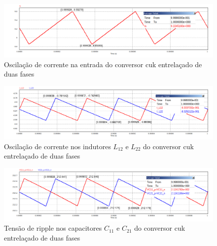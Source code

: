 \documentclass[
	12pt,				%
	openright,			%
	twoside,			%
	a4paper,			%
	english,			%
	french,				%
	spanish,			%
	brazil,				%
	]{abntex2}
\begin{document}
\begin{figure}[htb]%
	\captionsetup{justification=centering}
	\centering
		\includegraphics[width= \linewidth]{cuk_inter_ripp_I_S}
		\caption{Oscilação de corrente na entrada do conversor cuk entrelaçado de duas fases}
		\label{fig:cuk_inter_ripp_I_S}
\end{figure}

\begin{figure}[htb]%
	\captionsetup{justification=centering}
	\centering
		\includegraphics[width= \linewidth]{cuk_inter_ripp_I_LX2}
		\caption{Oscilação de corrente nos indutores $L_{12}$ e $L_{22}$ do conversor cuk entrelaçado de duas fases}
		\label{fig:cuk_inter_ripp_I_L2}
\end{figure}

\begin{figure}[H]%
	\captionsetup{justification=centering}
	\centering
		\includegraphics[width= \linewidth]{cuk_inter_ripp_V_CX1}
		\caption{Tensão de ripple nos capacitores $C_{11}$ e $C_{21}$ do conversor cuk entrelaçado de duas fases}
		\label{fig:cuk_inter_ripp_V_C1}
\end{figure}

\end{document}
